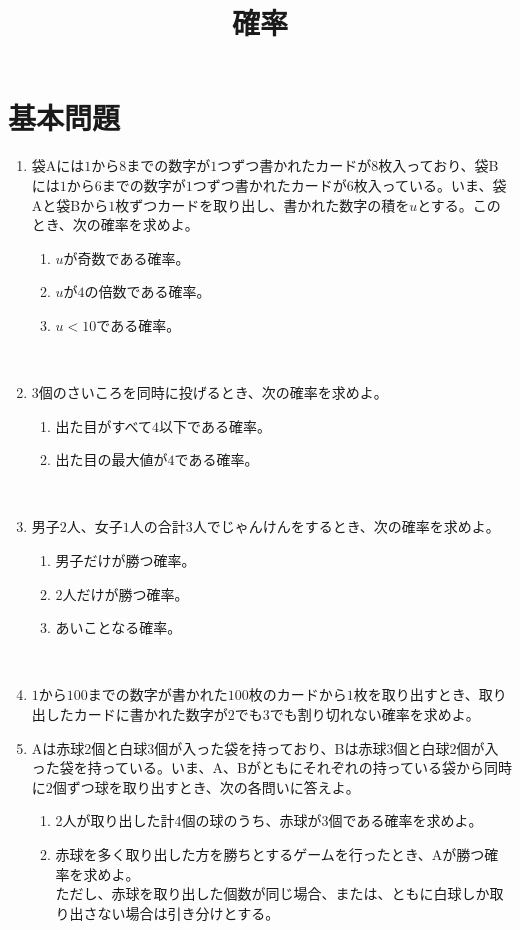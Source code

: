 \documentclass[10pt,a4paper,fleqn]{jsarticle}
\title{確率}
\date{}
\author{}
\begin{document}
\maketitle

\section{基本問題}

\begin{enumerate}
\item 袋Aには$1$から$8$までの数字が$1$つずつ書かれたカードが$8$枚入っており、袋Bには$1$から$6$までの数字が$1$つずつ書かれたカードが$6$枚入っている。いま、袋Aと袋Bから$1$枚ずつカードを取り出し、書かれた数字の積を$u$とする。このとき、次の確率を求めよ。
\begin{enumerate}[(1)]
\item $u$が奇数である確率。
\item $u$が$4$の倍数である確率。
\item $u<10$である確率。
\end{enumerate}\

\item $3$個のさいころを同時に投げるとき、次の確率を求めよ。
\begin{enumerate}[(1)]
\item 出た目がすべて$4$以下である確率。
\item 出た目の最大値が$4$である確率。
\end{enumerate}\

\item 男子$2$人、女子$1$人の合計$3$人でじゃんけんをするとき、次の確率を求めよ。
\begin{enumerate}[(1)]
\item 男子だけが勝つ確率。
\item $2$人だけが勝つ確率。
\item あいことなる確率。
\end{enumerate}\

\item $1$から$100$までの数字が書かれた$100$枚のカードから$1$枚を取り出すとき、取り出したカードに書かれた数字が$2$でも$3$でも割り切れない確率を求めよ。\\

\item Aは赤球2個と白球3個が入った袋を持っており、Bは赤球3個と白球2個が入った袋を持っている。いま、A、Bがともにそれぞれの持っている袋から同時に$2$個ずつ球を取り出すとき、次の各問いに答えよ。
\begin{enumerate}[(1)]
\item 2人が取り出した計4個の球のうち、赤球が3個である確率を求めよ。
\item 赤球を多く取り出した方を勝ちとするゲームを行ったとき、Aが勝つ確率を求めよ。\\
ただし、赤球を取り出した個数が同じ場合、または、ともに白球しか取り出さない場合は引き分けとする。
\end{enumerate}\


\end{enumerate}
\end{document}
